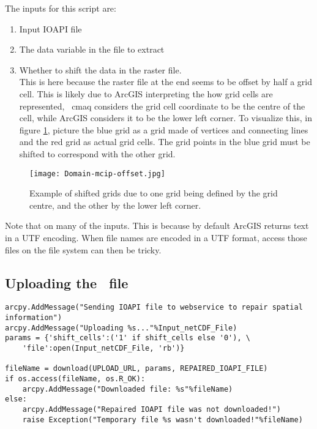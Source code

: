 The inputs for this script are:\begin{enumerate}
	\item Input IOAPI file
	\item The data variable in the file to extract
	\item Whether to shift the data in the raster file.\\
		This is here because the raster file at the end seems to be
offset by half a grid cell.  This is likely due to ArcGIS interpreting
the how grid cells are represented, \ie~\ac{cmaq} considers the grid
cell coordinate to be the centre of the cell, while ArcGIS considers
it to be the lower left corner.  To visualize this, in figure
\ref{offset}, picture the blue grid as a grid made of vertices and
connecting lines and the red grid as actual grid cells.  The grid
points in the blue grid must be shifted to correspond with the other
grid.
\end{enumerate}

\begin{figure}
	\centering
	\texttt{[image: Domain-mcip-offset.jpg]}
	\caption{Example of shifted grids due to one grid being defined by
the grid centre, and the other by the lower left corner.}
	\label{offset}
\end{figure}

Note that  on many of the inputs.  This is because by
default ArcGIS returns text in a UTF encoding.  When file names are encoded in
a UTF format, access those files on the file system can then be tricky.

\subsection{Uploading the \ioapi~file}

\singlespace
\begin{verbatim}
arcpy.AddMessage("Sending IOAPI file to webservice to repair spatial information")
arcpy.AddMessage("Uploading %s..."%Input_netCDF_File)
params = {'shift_cells':('1' if shift_cells else '0'), \
	'file':open(Input_netCDF_File, 'rb')}

fileName = download(UPLOAD_URL, params, REPAIRED_IOAPI_FILE)
if os.access(fileName, os.R_OK):
	arcpy.AddMessage("Downloaded file: %s"%fileName)
else:
	arcpy.AddMessage("Repaired IOAPI file was not downloaded!")
	raise Exception("Temporary file %s wasn't downloaded!"%fileName)
\end{verbatim}
\doublespace

